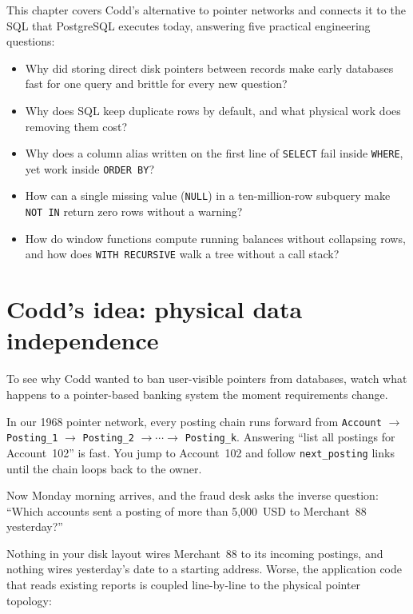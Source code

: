 \begin{focusbox}
This chapter covers Codd's alternative to pointer networks and connects it to the SQL that PostgreSQL executes today, answering five practical engineering questions:
\begin{itemize}
  \item Why did storing direct disk pointers between records make early databases fast for one query and brittle for every new question?
  \item Why does SQL keep duplicate rows by default, and what physical work does removing them cost?
  \item Why does a column alias written on the first line of \texttt{SELECT} fail inside \texttt{WHERE}, yet work inside \texttt{ORDER BY}?
  \item How can a single missing value (\texttt{NULL}) in a ten-million-row subquery make \texttt{NOT IN} return zero rows without a warning?
  \item How do window functions compute running balances without collapsing rows, and how does \texttt{WITH RECURSIVE} walk a tree without a call stack?
\end{itemize}
\end{focusbox}

\chapterline

\section{Codd's idea: physical data independence}
\label{sec:ch01-codd}

To see why Codd wanted to ban user-visible pointers from databases, watch what happens to a pointer-based banking system the moment requirements change.

In our 1968 pointer network, every posting chain runs forward from \texttt{Account} $\to$ \texttt{Posting\_1} $\to$ \texttt{Posting\_2} $\to \cdots \to$ \texttt{Posting\_k}. Answering ``list all postings for Account~102'' is fast. You jump to Account~102 and follow \texttt{next\_posting} links until the chain loops back to the owner.

Now Monday morning arrives, and the fraud desk asks the inverse question: ``Which accounts sent a posting of more than 5,000~USD to Merchant~88 yesterday?''

Nothing in your disk layout wires Merchant~88 to its incoming postings, and nothing wires yesterday's date to a starting address. Worse, the application code that reads existing reports is coupled line-by-line to the physical pointer topology:

